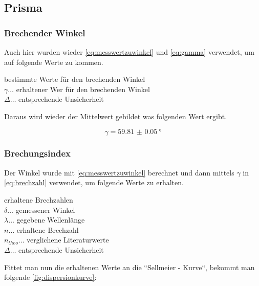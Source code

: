 \documentclass[11pt,ngerman]{scrartcl}
\begin{document}
\newpage

\subsection{Prisma}

\subsubsection{Brechender Winkel}

Auch hier wurden wieder \autoref{eq:messwertzuwinkel} und \autoref{eq:gamma} verwendet, um auf folgende Werte zu kommen.

\begin{table}[H]
	\caption{bestimmte Werte für den brechenden Winkel \\ $\gamma \dots$ erhaltener Wer für den brechenden Winkel \\ $\Delta \dots $ entsprechende Unsicherheit}
	\centering
	\label{tab:brechenderwinkel}
	
\end{table}

Daraus wird wieder der Mittelwert gebildet was folgenden Wert ergibt.

\begin{equation}
	\gamma = \SI{59.81(5)}{\degree}
	\label{eq:gammabar_wert}
\end{equation}

\subsubsection{Brechungsindex}

Der Winkel wurde mit \autoref{eq:messwertzuwinkel} berechnet und dann mittels
$\gamma$ in \autoref{eq:brechzahl} verwendet, um folgende Werte zu erhalten.

\begin{table}[H]
	\caption{erhaltene Brechzahlen \\ $\delta \dots$ gemessener Winkel \\
		$\lambda \dots$ gegebene Wellenlänge \\ $n \dots$ erhaltene Brechzahl \\
		$n_{theo} \dots$ verglichene Literaturwerte \cite{brechzahl} \\ $\Delta \dots$
		entsprechende Unsicherheit}
	\centering
	\label{tab:wertbrechzahl}
	
\end{table}

Fittet man nun die erhaltenen Werte an die ``Sellmeier - Kurve``, bekommt man folgende \autoref{fig:dispersionkurve}:
\end{document}
